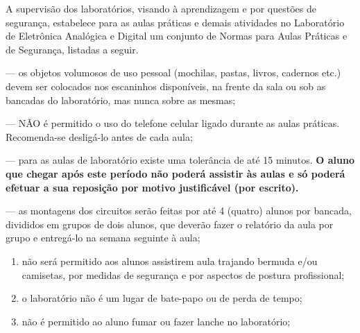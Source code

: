
A supervisão dos laboratórios, visando à aprendizagem e por questões de segurança,
estabelece para as aulas práticas e demais atividades no Laboratório de Eletrônica
Analógica e Digital um conjunto de Normas para Aulas Práticas e de Segurança, listadas
a seguir.


\begin{normas}[I]
   --- os objetos volumosos de uso pessoal (mochilas, pastas, livros,
  cadernos etc.) devem ser colocados nos escaninhos disponíveis, na frente da sala ou
  sob as bancadas do laboratório, mas nunca sobre as mesmas;

   --- NÃO é permitido o uso do telefone celular ligado durante as aulas
  práticas. Recomenda-se desligá-lo antes de cada aula;

   --- para as aulas de laboratório existe uma tolerância de até 15
  minutos. \textbf{O aluno que chegar após este período não poderá assistir às aulas e
  só poderá efetuar a sua reposição por motivo justificável (por escrito).}

   --- as montagens dos circuitos serão feitas por
  até 4 (quatro) alunos por bancada, divididos em grupos de dois alunos, que deverão
  fazer o relatório da aula por grupo e entregá-lo na semana seguinte à aula;

  \begin{enumerate}[label=\alph*),leftmargin=1.2cm]
    \item não será permitido aos alunos assistirem aula trajando bermuda e/ou
          camisetas, por medidas de segurança e por aspectos de postura profissional;
    \item o laboratório não é um lugar de bate-papo ou de perda de tempo;
    \item não é permitido ao aluno fumar ou fazer lanche no laboratório;
  \end{enumerate}
\end{normas}

